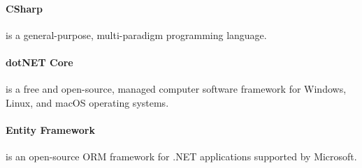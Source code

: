 \paragraph{CSharp}
is a general-purpose, multi-paradigm programming language.
\paragraph{dotNET Core}
is a free and open-source, managed computer software framework for Windows, Linux, and macOS operating systems.
\paragraph{Entity Framework}
is an open-source ORM framework for .NET applications supported by Microsoft.
